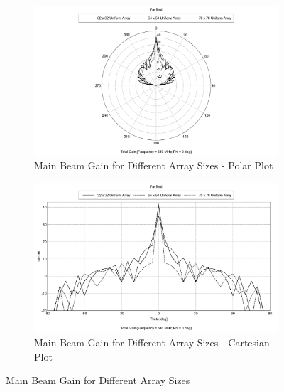 \documentclass[11pt]{witseiepaper}
\begin{document}
\begin{bibunit}[witseie]
\begin{figure}[htb]
    \centering
    \begin{subfigure}{.5\textwidth}
        \centering
            \includegraphics[width=0.9\linewidth]{BigArrayGain-Polar.pdf}
            \caption{Main Beam Gain for Different Array Sizes - Polar Plot}
            \label{fig:MainBeamGain-Polar}
        \end{subfigure}%
        \begin{subfigure}{.5\textwidth}
            \centering
            \includegraphics[width=0.9\linewidth]{BigArrayGain-Cartesian.pdf}
            \caption{Main Beam Gain for Different Array Sizes - Cartesian Plot}
                \label{fig:MainBeamGain-Cartesian}
            \end{subfigure}
\caption{Main Beam Gain for Different Array Sizes}
\label{fig:MainBeamGain}
\end{figure}


\end{bibunit}
\end{document}
